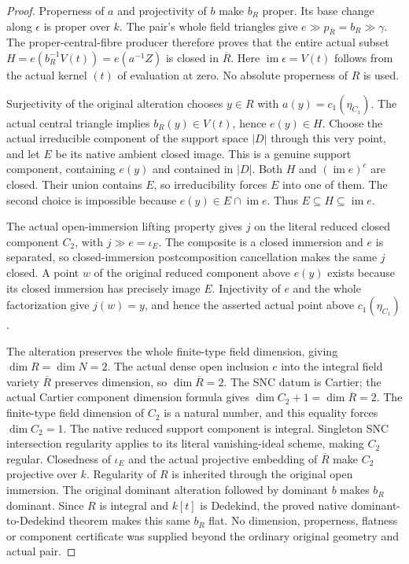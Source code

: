 \begin{proof}
Properness of $a$ and projectivity of $b$ make $b_R$ proper. Its base
change along $\epsilon$ is proper over $k$. The pair's whole field
triangles give
$e\gg p_{\overline R}=b_R\gg\gamma$. The proper-central-fibre
producer therefore proves that the entire actual subset
$H=e(b_R^{-1}V(t))=e(a^{-1}Z)$ is closed in $\overline R$.
Here $\operatorname{im}\epsilon=V(t)$ follows from the actual kernel
$(t)$ of evaluation at zero. No absolute properness of $R$ is used.

Surjectivity of the original alteration chooses $y\in R$ with
$a(y)=c_1(\eta_{C_1})$. The actual central triangle implies
$b_R(y)\in V(t)$, hence $e(y)\in H$. Choose the actual irreducible
component of the support space $|D|$ through this very point, and let
$E$ be its native ambient closed image. This is a genuine support
component, containing $e(y)$ and contained in $|D|$.
Both $H$ and $(\operatorname{im}e)^c$ are closed. Their union contains
$E$, so irreducibility forces $E$ into one of them. The second choice
is impossible because $e(y)\in E\cap\operatorname{im}e$.
Thus $E\subseteq H\subseteq\operatorname{im}e$.

The actual open-immersion lifting property gives $j$ on the literal
reduced closed component $C_2$, with $j\gg e=\iota_E$. The composite
is a closed immersion and $e$ is separated, so closed-immersion
postcomposition cancellation makes the same $j$ closed. A point $w$
of the original reduced component above $e(y)$ exists because its
closed immersion has precisely image $E$. Injectivity of $e$ and
the whole factorization give $j(w)=y$, and hence the asserted actual
point above $c_1(\eta_{C_1})$.

The alteration preserves the whole finite-type field dimension,
giving $\dim R=\dim N=2$. The actual dense open inclusion $e$ into
the integral field variety $\overline R$ preserves dimension, so
$\dim\overline R=2$. The SNC datum is Cartier; the actual Cartier
component dimension formula gives
$\dim C_2+1=\dim\overline R=2$. The finite-type field dimension of
$C_2$ is a natural number, and this equality forces $\dim C_2=1$.
The native reduced support component is integral. Singleton SNC
intersection regularity applies to its literal vanishing-ideal
scheme, making $C_2$ regular. Closedness of $\iota_E$ and the actual
projective embedding of $\overline R$ make $C_2$ projective over $k$.
Regularity of $R$ is inherited through the original open immersion.
The original dominant alteration followed by dominant $b$ makes
$b_R$ dominant. Since $R$ is integral and $k[t]$ is Dedekind, the
proved native dominant-to-Dedekind theorem makes this same $b_R$
flat. No dimension, properness, flatness or component certificate
was supplied beyond the ordinary original geometry and actual pair.
\end{proof}

